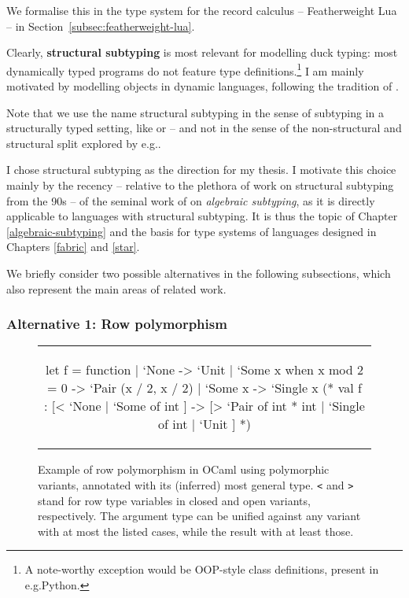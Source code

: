 We formalise this in the type system for the record calculus -- Featherweight Lua -- in Section~\ref{subsec:featherweight-lua}.

Clearly, \textbf{structural subtyping} is most relevant for modelling duck typing: most dynamically typed programs do not feature type definitions.\footnote{A note-worthy exception would be OOP-style class definitions, present in e.g.\@ Python.} I am mainly motivated by modelling objects in dynamic languages, following the tradition of \textcite{cardelli-multiple-inheritance}.

Note that we use the name structural subtyping in the sense of subtyping in a structurally typed setting, like \textcite{dolan-thesis} or \textcite{cardelli-power-type} -- and not in the sense of the non-structural and structural split explored by e.g.\@ \textcite{subtyping-decidability}.

I chose structural subtyping as the direction for my thesis. I motivate this choice mainly by the recency -- relative to the plethora of work on structural subtyping from the 90s -- of the seminal work of \textcite{mlsub} on \emph{algebraic subtyping}, as it is directly applicable to languages with structural subtyping. It is thus the topic of Chapter \ref{algebraic-subtyping} and the basis for type systems of languages designed in Chapters \ref{fabric} and \ref{star}.

We briefly consider two possible alternatives in the following subsections, which also represent the main areas of related work.

\subsubsection{Alternative 1: Row polymorphism}

\begin{figure}
    \centering
    \begin{tabular}{c}
    \begin{ocaml}
let f = function 
    | `None -> `Unit 
    | `Some x when x mod 2 = 0 -> `Pair (x / 2, x / 2) 
    | `Some x -> `Single x
(* 
val f : [< `None | `Some of int ] 
     -> [> `Pair of int * int | `Single of int | `Unit ]
*)
    \end{ocaml}
    \end{tabular}
    \caption{Example of row polymorphism in OCaml using polymorphic variants, annotated with its (inferred) most general type. \texttt{<} and \texttt{>} stand for row type variables in closed and open variants, respectively. The argument type can be unified against any variant with at most the listed cases, while the result with at least those.}
    \label{fig:ocaml-row-polymorphism}
\end{figure}

